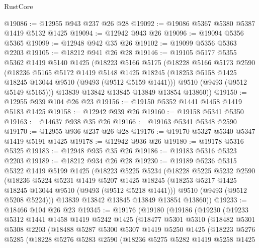 \begin{lexlean}{RustCore}
\begin{coremodule}
@19086 := @12955 @943 @237 @26 @28
@19092 := @19086 @5367 @5380 @5387 @1419 @5132 @1425
@19094 := @12942 @943 @26
@19096 := @19094 @5356 @5365
@19099 := @12948 @942 @35 @26
@19102 := @19099 @5356 @5363 @2203
@19105 := @18212 @941 @26 @28
@19146 := @19105
    @5177
    @5355
    @5362
    @1419
    @5140
    @1425
    (@18223
      @5166
      @5175
      (@18228
        @5166
        @5173
        @2590
        (@18236
          @5165
          @5172
          @1419
          @5148
          @1425
          @18245
          (@18253 @5158 @1425 @18245 @13044 @9510 (@9493 (@9512 @5159 @1441)))
          @9510
          (@9493 (@9512 @5149 @5165)))
        @13839
        @13842
        @13845
        @13849
        @13854
        @13860))
@19150 := @12955 @939 @104 @26 @23
@19156 := @19150 @5352 @1441 @1458 @1419 @5183 @1425
@19158 := @12942 @939 @26
@19160 := @19158 @5341 @5350
@19163 := @14637 @938 @35 @26
@19166 := @19163 @5341 @5348 @2590
@19170 := @12955 @936 @237 @26 @28
@19176 := @19170 @5327 @5340 @5347 @1419 @5191 @1425
@19178 := @12942 @936 @26
@19180 := @19178 @5316 @5325
@19183 := @12948 @935 @35 @26
@19186 := @19183 @5316 @5323 @2203
@19189 := @18212 @934 @26 @28
@19230 := @19189
    @5236
    @5315
    @5322
    @1419
    @5199
    @1425
    (@18223
      @5225
      @5234
      (@18228
        @5225
        @5232
        @2590
        (@18236
          @5224
          @5231
          @1419
          @5207
          @1425
          @18245
          (@18253 @5217 @1425 @18245 @13044 @9510 (@9493 (@9512 @5218 @1441)))
          @9510
          (@9493 (@9512 @5208 @5224)))
        @13839
        @13842
        @13845
        @13849
        @13854
        @13860))
@19233 := @18466 @104 @26 @23
@19345 := @19176
    (@19180
      (@19186
        (@19230
          (@19233
            @5312
            @1441
            @1458
            @1419
            @5242
            @1425
            (@18477
              @5301
              @5310
              (@18482
                @5301
                @5308
                @2203
                (@18488
                  @5287
                  @5300
                  @5307
                  @1419
                  @5250
                  @1425
                  (@18223
                    @5276
                    @5285
                    (@18228
                      @5276
                      @5283
                      @2590
                      (@18236
                        @5275
                        @5282
                        @1419
                        @5258
                        @1425

\end{coremodule}
\end{lexlean}
